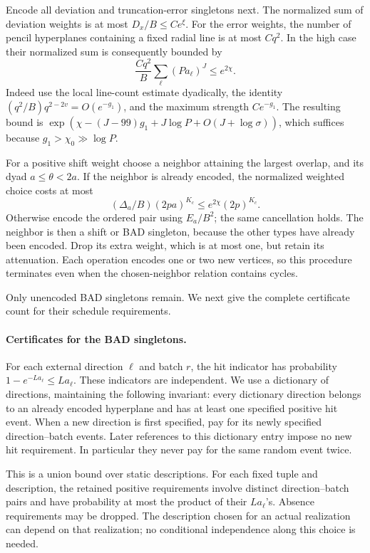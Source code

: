 Encode all deviation and truncation-error singletons next.  The
normalized sum of deviation weights is at most \(D_x/B\le Ce^\xi\).
For the error weights, the number of pencil hyperplanes containing a
fixed radial line is at most \(Cq^2\).  In the high case their normalized
sum is consequently bounded by
\[
 \frac{Cq^2}{B}\sum_\ell(Pa_\ell)^J\le e^{2\chi}.
\]
Indeed use the local line-count estimate dyadically, the identity
\((q^2/B)q^{2-2v}=O(e^{-g_1})\), and the maximum strength \(Ce^{-g_1}\).
The resulting bound is
\(\exp(\chi-(J-99)g_1+J\log P+O(J+\log\sigma))\), which suffices because
\(g_1>\chi_0\gg\log P\).

For a positive shift weight choose a neighbor attaining the largest
overlap, and its dyad \(a\le\theta<2a\).  If the neighbor is already
encoded, the normalized weighted choice costs at most
\[
 (\Delta_a/B)(2pa)^{K_c}\le e^{2\chi}(2p)^{K_c}.
\]
Otherwise encode the ordered pair using \(E_a/B^2\); the same
cancellation holds.  The neighbor is then a shift or BAD singleton,
because the other types have already been encoded.  Drop its extra
weight, which is at most one, but retain its attenuation.  Each operation
encodes one or two new vertices, so this procedure terminates even when
the chosen-neighbor relation contains cycles.

Only unencoded BAD singletons remain.  We next give the complete
certificate count for their schedule requirements.

\paragraph{Certificates for the BAD singletons.}
For each external direction \(\ell\) and batch \(r\), the hit indicator
has probability \(1-e^{-La_\ell}\le La_\ell\).  These indicators are
independent.  We use a dictionary of directions, maintaining the
following invariant: every dictionary direction belongs to an already
encoded hyperplane and has at least one specified positive hit event.
When a new direction is first specified, pay for its newly specified
direction--batch events.  Later references to this dictionary entry
impose no new hit requirement.  In particular they never pay for the
same random event twice.

This is a union bound over static descriptions.  For each fixed tuple
and description, the retained positive requirements involve distinct
direction--batch pairs and have probability at most the product of their
\(La_\ell\)'s.  Absence requirements may be dropped.  The description
chosen for an actual realization can depend on that realization; no
conditional independence along this choice is needed.

